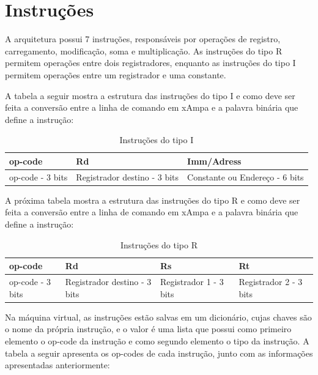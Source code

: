 \documentclass[
	12pt,				%
	oneside,			%
	a4paper,			%
	english,			%
	french,				%
	spanish,			%
	brazil				%
	]{abntex2}
\begin{document}
\section{Instruções}

A arquitetura possui 7 instruções, responsáveis por operações de registro, carregamento, modificação, soma e multiplicação. As instruções do tipo R permitem operações entre dois registradores, enquanto as instruções do tipo I permitem operações entre um registrador e uma constante. 

A tabela a seguir mostra a estrutura das instruções do tipo I e como deve ser feita a conversão entre a linha de comando em xAmpa e a palavra binária que define a instrução:\\

\begin{table}[htb]
\center
\footnotesize
\begin{tabular}{|p{2.5cm}|p{4cm}|p{5cm}|}
  \hline
   \textbf{op-code} & \textbf{Rd} & \textbf{Imm/Adress}\\
    \hline
    op-code - 3 bits & Registrador destino - 3 bits & Constante ou Endereço - 6 bits\\
    \hline
\end{tabular}
\caption{Instruções do tipo I}
\label{table4:sample}
\end{table}

A próxima tabela mostra a estrutura das instruções do tipo R e como deve ser feita a conversão entre a linha de comando em xAmpa e a palavra binária que define a instrução:\\

\begin{table}[htb]
\center
\footnotesize
\begin{tabular}{|p{2.5cm}|p{4cm}|p{3.5cm}|p{3.5cm}|}
  \hline
   \textbf{op-code} & \textbf{Rd} & \textbf{Rs} & \textbf{Rt}\\
    \hline
    op-code - 3 bits & Registrador destino - 3 bits & Registrador 1 - 3 bits & Registrador 2 - 3 bits\\
    \hline
\end{tabular}
\caption{Instruções do tipo R}
\label{table5:sample}
\end{table}

Na máquina virtual, as instruções estão salvas em um dicionário, cujas chaves são o nome da própria instrução, e o valor é uma lista que possui como primeiro elemento o op-code da instrução e como segundo elemento o tipo da instrução. A tabela a seguir apresenta os op-codes de cada instrução, junto com as informações apresentadas anteriormente:\\
\end{document}
